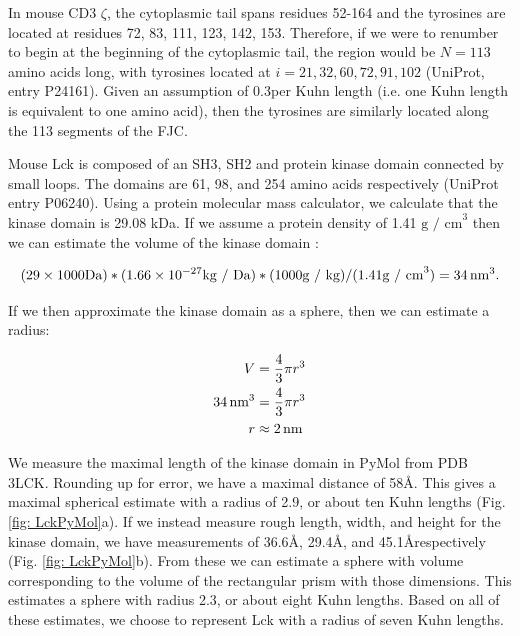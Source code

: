 \documentclass[../AdvancementSummary.tex]{subfiles}
\begin{document}
In mouse CD3 $\zeta$, the cytoplasmic tail spans residues 52-164 and the tyrosines are located at residues 72, 83, 111, 123, 142, 153. Therefore, if we were to renumber to begin at the beginning of the cytoplasmic tail, the region would be $N=113$ amino acids long, with tyrosines located at $i= 21, 32, 60, 72, 91, 102$ (UniProt, entry P24161). Given an assumption of 0.3\nm per Kuhn length (i.e. one Kuhn length is equivalent to one amino acid), then the tyrosines are similarly located along the 113 segments of the FJC.

Mouse Lck is composed of an SH3, SH2 and protein kinase domain connected by small loops. The domains are 61, 98, and 254 amino acids respectively (UniProt entry P06240). Using a protein molecular mass calculator, %
we calculate that the kinase domain is 29.08 kDa. If we assume a protein density of 1.41 $\mbox{g / cm}^3$ then we can estimate the volume of the kinase domain \cite{Fischer2004}:

\begin{equation*}
(29 \times 1000 \mbox{Da}) * (1.66\times10^{-27} \mbox{kg / Da}) * (1000 \mbox{g / kg}) / (1.41 \mbox{g / cm}^3) = 34 \,\mbox{nm}^3.
\end{equation*}

If we then approximate the kinase domain as a sphere, then we can estimate a radius: 

\begin{align*}
V &= \frac{4}{3}\pi r^3 \\
34 \,\mbox{nm}^3 &= \frac{4}{3} \pi r^3 \\
r &\approx 2 \,\mbox{nm} \\
\end{align*}
%

We measure the maximal length of the kinase domain in PyMol from PDB 3LCK. Rounding up for error, we have a maximal distance of 58\AA. This gives a maximal spherical estimate with a radius of 2.9\nm, or about ten Kuhn lengths (Fig. \ref{fig: LckPyMol}a). If we instead measure rough length, width, and height for the kinase domain, we have measurements of 36.6\AA, 29.4\AA, and 45.1\AA respectively (Fig. \ref{fig: LckPyMol}b). From these we can estimate a sphere with volume corresponding to the volume of the rectangular prism with those dimensions. This estimates a sphere with radius 2.3\nm, or about eight Kuhn lengths. Based on all of these estimates, we choose to represent Lck with a radius of seven Kuhn lengths.
\end{document}

